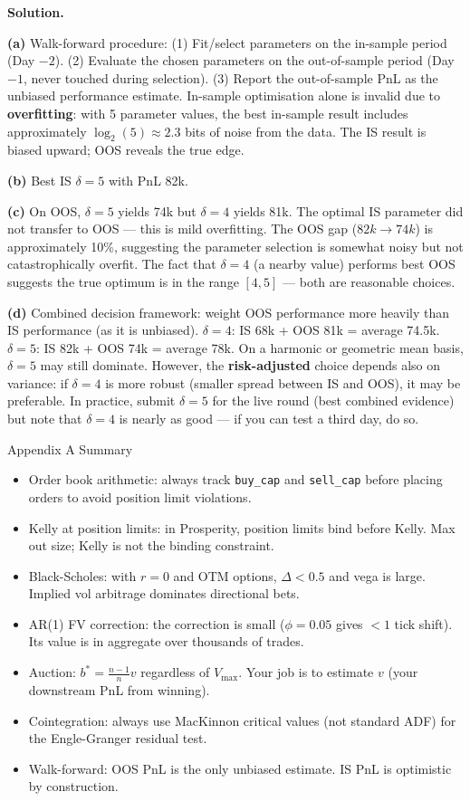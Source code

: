 \documentclass[12pt,a4paper,openany]{report}
\theoremstyle{definition}
\begin{document}
\textbf{Solution.}

\textbf{(a)} Walk-forward procedure: (1) Fit/select parameters on the in-sample period (Day $-2$). (2) Evaluate the chosen parameters on the out-of-sample period (Day $-1$, never touched during selection). (3) Report the out-of-sample PnL as the unbiased performance estimate. In-sample optimisation alone is invalid due to \textbf{overfitting}: with 5 parameter values, the best in-sample result includes approximately $\log_2(5) \approx 2.3$ bits of noise from the data. The IS result is biased upward; OOS reveals the true edge.

\textbf{(b)} Best IS $\delta = 5$ with PnL 82k.

\textbf{(c)} On OOS, $\delta = 5$ yields 74k but $\delta = 4$ yields 81k. The optimal IS parameter did not transfer to OOS — this is mild overfitting. The OOS gap ($82k \to 74k$) is approximately 10\%, suggesting the parameter selection is somewhat noisy but not catastrophically overfit. The fact that $\delta = 4$ (a nearby value) performs best OOS suggests the true optimum is in the range $[4, 5]$ — both are reasonable choices.

\textbf{(d)} Combined decision framework: weight OOS performance more heavily than IS performance (as it is unbiased). $\delta = 4$: IS 68k + OOS 81k = average 74.5k. $\delta = 5$: IS 82k + OOS 74k = average 78k. On a harmonic or geometric mean basis, $\delta = 5$ may still dominate. However, the \textbf{risk-adjusted} choice depends also on variance: if $\delta = 4$ is more robust (smaller spread between IS and OOS), it may be preferable. In practice, submit $\delta = 5$ for the live round (best combined evidence) but note that $\delta = 4$ is nearly as good — if you can test a third day, do so.

\begin{takeawaybox}{Appendix A Summary}
\begin{itemize}
  \item Order book arithmetic: always track \texttt{buy\_cap} and \texttt{sell\_cap} before placing orders to avoid position limit violations.
  \item Kelly at position limits: in Prosperity, position limits bind before Kelly. Max out size; Kelly is not the binding constraint.
  \item Black-Scholes: with $r = 0$ and OTM options, $\Delta < 0.5$ and vega is large. Implied vol arbitrage dominates directional bets.
  \item AR(1) FV correction: the correction is small ($\phi = 0.05$ gives $< 1$ tick shift). Its value is in aggregate over thousands of trades.
  \item Auction: $b^* = \frac{n-1}{n}v$ regardless of $V_{\max}$. Your job is to estimate $v$ (your downstream PnL from winning).
  \item Cointegration: always use MacKinnon critical values (not standard ADF) for the Engle-Granger residual test.
  \item Walk-forward: OOS PnL is the only unbiased estimate. IS PnL is optimistic by construction.
\end{itemize}
\end{takeawaybox}

\end{document}
